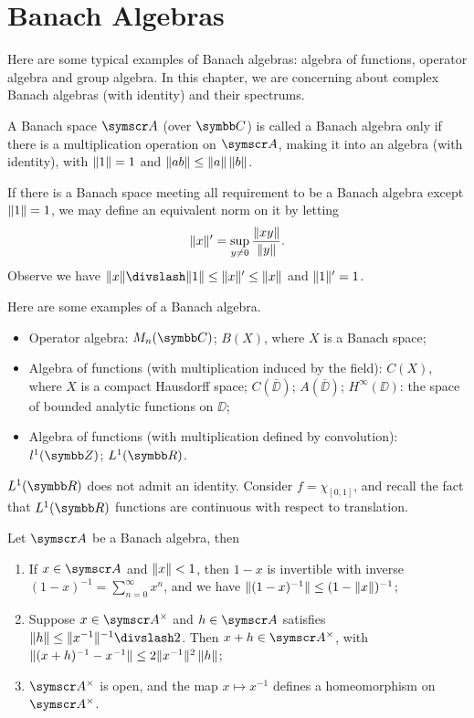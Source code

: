 
\chapter{Banach Algebras}

Here are some typical examples of Banach algebras: algebra of functions, operator algebra and group algebra. In this chapter, we are concerning about complex Banach algebras (with identity) and their spectrums.

\begin{definition}
  A Banach space $\BA{A}$ (over $\CC$) is called a Banach algebra only if there is a multiplication operation on $\BA{A}$, making it into an algebra (with identity), with $\Vert1\Vert=1$ and $\Vert ab\Vert\leq \Vert a\Vert\,\Vert b\Vert$.
\end{definition}

If there is a Banach space meeting all requirement to be a Banach algebra except $\Vert1\Vert=1$, we may define an equivalent norm on it by letting
\begin{equation*}
  \Vert x\Vert'=\sup_{y\neq 0}\frac{\Vert xy\Vert}{\Vert y\Vert}.
\end{equation*}
Observe we have $\NORM{x}\DIV\NORM{1}\leq\NORM{x}'\leq\NORM{x}$ and $\Vert1\Vert'=1$.

Here are some examples of a Banach algebra.

\begin{itemize}
  \item Operator algebra: $M_n(\CC)$; $B(X)$, where $X$ is a Banach space;
  \item Algebra of functions (with multiplication induced by the field): $C(X)$, where $X$ is a compact Hausdorff space; $C(\overline\DD)$; $A(\overline\DD)$; $H^{\infty}(\DD)$: the space of bounded analytic functions on $\DD$;
  \item Algebra of functions (with multiplication defined by convolution): $l^1(\ZZ)$; $L^1(\RR)$.
\end{itemize}

\begin{example}
  $L^1(\RR)$ does not admit an identity. Consider $f = \chi_{[0, 1]}$, and recall the fact that $L^1(\RR)$ functions are continuous with respect to translation.
\end{example}

\begin{proposition}
  Let $\BA{A}$ be a Banach algebra, then
  \begin{enumerate}
    \item If $x\in \BA{A}$ and $\Vert x\Vert<1$, then $1-x$ is invertible with inverse $(1-x)^{-1}=\sum_{n=0}^\infty x^n$, and we have $\Vert(1-x)^{-1}\Vert\leq (1-\Vert x\Vert)^{-1}$;
    \item Suppose $x\in \BA{A}^\times$ and $h\in \BA{A}$ satisfies $\NORM{h}\leq\NORM{x^{-1}}^{-1}\DIV 2$. Then $x+h\in \BA{A}^{\times}$, with $\Vert(x+h)^{-1}-x^{-1}\Vert\leq 2\Vert x^{-1}\Vert^2\,\Vert h\Vert$;
    \item $\BA{A}^\times$ is open, and the map $x\mapsto x^{-1}$ defines a homeomorphism on $\BA{A}^\times$.
  \end{enumerate}
\end{proposition}


